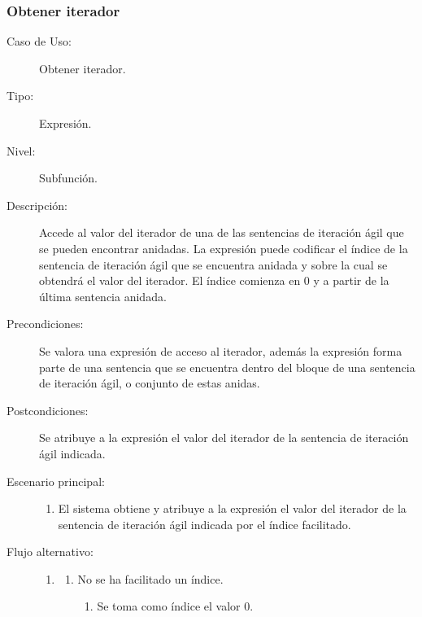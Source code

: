 \subsubsection {Obtener iterador}
\begin{framed}
\FloatBarrier
\begin{description}
   \item[Caso de Uso:]  Obtener iterador.
   \item [Tipo:] Expresión.
   \item[Nivel:]  Subfunción.
   \item[Descripción:] 
   Accede al valor del iterador de una de las sentencias de iteración ágil que se pueden encontrar anidadas.  
   La expresión puede codificar el índice de la sentencia de iteración ágil que se encuentra anidada y sobre la
   cual se obtendrá el valor del iterador. El índice comienza en 0 y a partir de la última sentencia anidada.
   \item[Precondiciones:] 
   Se valora una expresión de acceso al iterador, además la expresión forma parte 
   de una sentencia que se encuentra dentro del bloque de una sentencia de iteración ágil, o conjunto 
   de estas anidas.
   \item[Postcondiciones:] 
   Se atribuye a la expresión el valor del iterador de la sentencia de iteración ágil 
   indicada.   
   \item[Escenario principal:] \hfill
   \begin{enumerate}
   \item El sistema obtiene y atribuye a la expresión el valor del iterador 
   de la sentencia de iteración ágil indicada por el índice facilitado.
   \end{enumerate}
   \item[Flujo alternativo:] \hfill 
   \begin{enumerate} \itemsep1pt \parskip0pt 
   \setcounter{enumi}{0}
   \renewcommand{\labelenumi}{}
   \renewcommand{\labelenumiii}{\arabic{enumiii}.}
   \renewcommand{\labelenumii}{\arabic{enumi}\alph{enumii}.}
      \item 
      \begin {enumerate}
         \setcounter{enumii}{0}
         \item No se ha facilitado un índice.
         \begin{enumerate}
         \item Se toma como índice el valor 0. 
         \end{enumerate}
      \end{enumerate}

\end{enumerate}
\end{description}
\end{framed}

